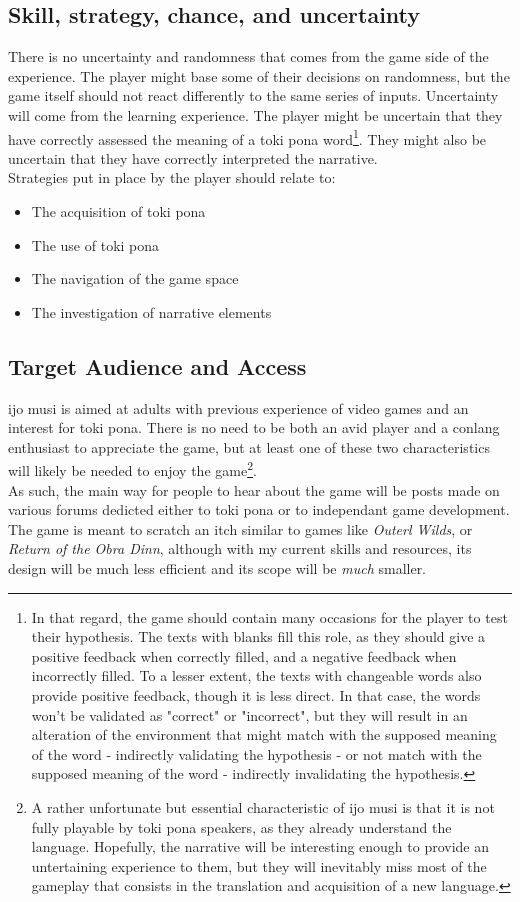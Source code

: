 \documentclass{scrartcl}
\begin{document}
		\subsection{Skill, strategy, chance, and uncertainty}
			There is no uncertainty and randomness that comes from the game side of the experience. The player might base some of their decisions on randomness, but the game itself should not react differently to the same series of inputs. Uncertainty will come from the learning experience. The player might be uncertain that they have correctly assessed the meaning of a toki pona word\footnote{In that regard, the game should contain many occasions for the player to test their hypothesis. The texts with blanks  fill this role, as they should give a positive feedback when correctly filled, and a negative feedback when incorrectly filled. To a lesser extent, the texts with changeable words also provide positive feedback, though it is less direct. In that case, the words won't be validated as "correct" or "incorrect", but they will result in an alteration of the environment that might match with the supposed meaning of the word - indirectly validating the hypothesis - or not match with the supposed meaning of the word - indirectly invalidating the hypothesis.}. They might also be uncertain that they have correctly interpreted the narrative. \\ 
		Strategies put in place by the player should relate to:
		\begin{itemize}
			\item The acquisition of toki pona
			\item The use of toki pona
			\item The navigation of the game space
			\item The investigation of narrative elements
		\end{itemize}
		\subsection{Target Audience and Access}
			ijo musi is aimed at adults with previous experience of video games and an interest for toki pona. There is no need to be both an avid player and a conlang enthusiast to appreciate the game, but at least one of these two characteristics will likely be needed to enjoy the game\footnote{A rather unfortunate but essential characteristic of ijo musi is that it is not fully playable by toki pona speakers, as they already understand the language. Hopefully, the narrative will be interesting enough to provide an untertaining experience to them, but they will inevitably miss most of the gameplay that consists in the translation and acquisition of a new language.}.\\
			As such, the main way for people to hear about the game will be posts made on various forums dedicted either to toki pona or to independant game development.\\
			The game is meant to scratch an itch similar to games like \textit{Outerl Wilds}, or \textit{Return of the Obra Dinn}, although with my current skills and resources, its design will be much less efficient and its scope will be \textit{much} smaller.
\end{document}
